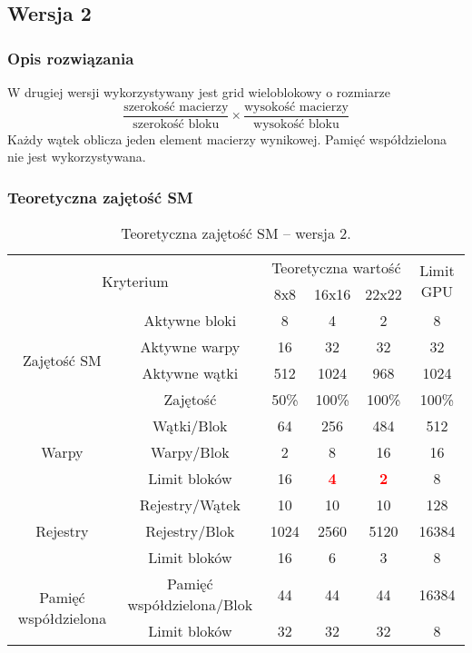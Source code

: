 
\subsection{Wersja 2}

\subsubsection{Opis rozwiązania}

W drugiej wersji wykorzystywany jest grid wieloblokowy o rozmiarze\footnotemark $$\frac{\text{szerokość macierzy}}{\text{szerokość bloku}} \times \frac{\text{wysokość macierzy}}{\text{wysokość bloku}}$$
Każdy wątek oblicza jeden element macierzy wynikowej. Pamięć współdzielona nie jest wykorzystywana.



\subsubsection{Teoretyczna zajętość SM}

\begin{center}
\begin{table}[H]
\centering
\begin{tabular}{|c|c|c|c|c|c|}
\hline
\multicolumn{2}{|c|}{\multirow{2}{*}{Kryterium}} & \multicolumn{3}{c|}{Teoretyczna wartość} & \multirow{2}{*}{Limit GPU} \\ \cline{3-5}
\multicolumn{2}{|c|}{} & 8x8 & 16x16 & 22x22 & \\ \hline
\multirow{4}{*}{Zajętość SM} & Aktywne bloki & 8 & 4 & 2 & 8 \\ \cline{2-6}
& Aktywne warpy & 16 & 32 & 32 & 32 \\ \cline{2-6}
& Aktywne wątki & 512 & 1024 & 968 & 1024 \\ \cline{2-6}
& Zajętość & 50\% & 100\% & 100\% & 100\% \\ \hline
\multirow{3}{*}{Warpy} & Wątki/Blok & 64 & 256 & 484 & 512 \\ \cline{2-6}
& Warpy/Blok & 2 & 8 & 16 & 16 \\ \cline{2-6}
& Limit bloków & 16 & \textcolor{red}{\textbf{4}} & \textcolor{red}{\textbf{2}} & 8 \\ \hline
\multirow{3}{*}{Rejestry} & Rejestry/Wątek & 10 & 10 & 10 & 128 \\ \cline{2-6}
& Rejestry/Blok & 1024 & 2560 & 5120 & 16384 \\ \cline{2-6}
& Limit bloków & 16 & 6 & 3 & 8 \\ \hline
\multirow{2}{*}{Pamięć współdzielona} & Pamięć współdzielona/Blok & 44 & 44 & 44 & 16384 \\ \cline{2-6}
& Limit bloków & 32 & 32 & 32 & 8 \\ \hline
\end{tabular}
\caption{Teoretyczna zajętość SM -- wersja 2.}
\end{table}
\end{center}

